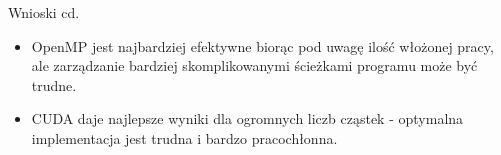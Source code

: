 \documentclass[handout]{beamer}
\begin{document}
\begin{frame}{Wnioski cd.}
\begin{itemize}
\item OpenMP jest najbardziej efektywne biorąc pod uwagę ilość włożonej pracy, ale zarządzanie bardziej skomplikowanymi ścieżkami programu może być trudne.
\item CUDA daje najlepsze wyniki dla ogromnych liczb cząstek - optymalna implementacja jest trudna i bardzo pracochłonna.
\end{itemize}
\end{frame}
\end{document}
